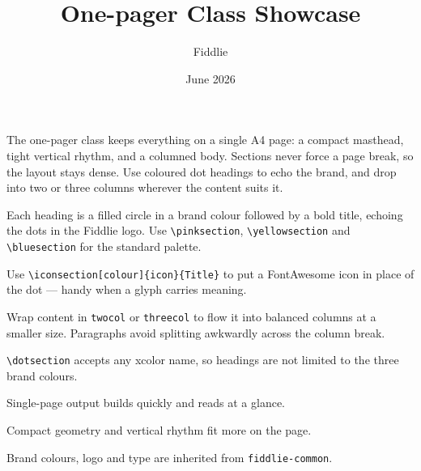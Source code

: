 \documentclass[]{onepager}
\title{One-pager Class Showcase}
\author{Fiddlie}
\date{June 2026}
\begin{document}
\maketitle

\begin{small}
The one-pager class keeps everything on a single A4 page: a compact masthead,
tight vertical rhythm, and a columned body. Sections never force a page break,
so the layout stays dense. Use coloured dot headings to echo the brand, and
drop into two or three columns wherever the content suits it.
\end{small}

\vspace{4pt}

\begin{twocol}
  Each heading is a filled circle in a brand colour followed by a bold title,
  echoing the dots in the Fiddlie logo. Use \texttt{\textbackslash pinksection},
  \texttt{\textbackslash yellowsection} and \texttt{\textbackslash bluesection}
  for the standard palette.

  Use \texttt{\textbackslash iconsection[colour]\{icon\}\{Title\}} to put a
  FontAwesome icon in place of the dot — handy when a glyph carries meaning.

  Wrap content in \texttt{twocol} or \texttt{threecol} to flow it into balanced
  columns at a smaller size. Paragraphs avoid splitting awkwardly across the
  column break.

  \texttt{\textbackslash dotsection} accepts any xcolor name, so headings are
  not limited to the three brand colours.
\end{twocol}

\vspace{2pt}

\begin{threecol}
  Single-page output builds quickly and reads at a glance.

  Compact geometry and vertical rhythm fit more on the page.

  Brand colours, logo and type are inherited from \texttt{fiddlie-common}.
\end{threecol}
\end{document}
